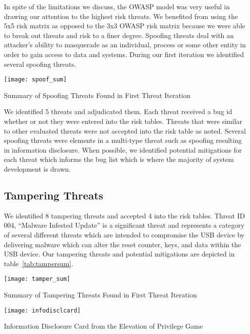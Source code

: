 In spite of the limitations we discuss, the OWASP model was very useful in
drawing our attention to the highest risk threats.  We benefited from using the
5x5 risk matrix as opposed to the 3x3 OWASP risk matrix because we were able to
break out threats and risk to a finer degree. Spoofing threats deal with an
attacker's ability to masquerade as an individual, process or some other entity
in order to gain access to data and systems.  During our first iteration we
identified several spoofing threats.

\begin{table*}[ht]
    \centering
    \texttt{[image: spoof\_sum]}
    \caption{Summary of Spoofing Threats Found in First Threat Iteration}
    \label{tab:spoofsum}
\end{table*}
We identified 5 threats and adjudicated them. Each threat received a bug id
whether or not they were entered into the risk tables.  Threats that were
similar to other evaluated threats were not accepted into the risk table as
noted. Several spoofing threats were elements in a multi-type threat such as
spoofing resulting in information disclosure. When possible, we identified
potential mitigations for each threat which informs the bug list which is where
the majority of system development is drawn.

\subsection{Tampering Threats}

We identified 8 tampering threats and accepted 4 into the risk tables.  Threat ID 004,
``Malware Infested Update'' is a significant threat and represents a category of
several different threats which are intended to compromise the USB device by
delivering malware which can alter the reset counter, keys, and data within the
USB device. 
Our tampering threats and potential mitigations are depicted in
table~\ref{tab:tampersum}.

\begin{table*}[]
    \centering
    \texttt{[image: tamper\_sum]}
    \caption{Summary of Tampering Threats Found in First Threat Iteration}
    \label{tab:tampersum}
\end{table*}

\begin{marginfigure}[0.25in]%
\centering
  \texttt{[image: infodisclcard]}
  \caption{Information Disclosure Card from the Elevation of Privilege Game}
  \label{fig:spoofcard}
\end{marginfigure}

